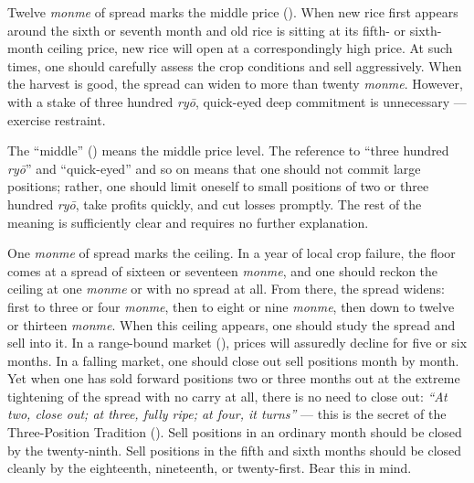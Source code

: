 
\begin{sokyubox}
{\small\itshape\color{sokyubar} }

\medskip
Twelve \textit{monme} of spread marks the middle price ().
When new rice first appears around the sixth or seventh month and
old rice is sitting at its fifth- or sixth-month ceiling price, new
rice will open at a correspondingly high price. At such times, one
should carefully assess the crop conditions and sell aggressively.
When the harvest is good, the spread can widen to more than twenty
\textit{monme}. However, with a stake of three hundred \textit{ry\=o}, quick-eyed
deep commitment is unnecessary --- exercise restraint.
\end{sokyubox}

\commentary
The ``middle'' () means the middle price level. The reference
to ``three hundred \textit{ry\=o}'' and ``quick-eyed'' and so on means that one
should not commit large positions; rather, one should limit oneself
to small positions of two or three hundred \textit{ry\=o}, take profits
quickly, and cut losses promptly. The rest of the meaning is
sufficiently clear and requires no further explanation.


\begin{sokyubox}
{\small\itshape\color{sokyubar} }

\medskip
One \textit{monme} of spread marks the ceiling. In a year of local crop
failure, the floor comes at a spread of sixteen or seventeen \textit{monme},
and one should reckon the ceiling at one \textit{monme} or with no spread at
all. From there, the spread widens: first to three or four \textit{monme},
then to eight or nine \textit{monme}, then down to twelve or thirteen \textit{monme}.
When this ceiling appears, one should study the spread and sell into
it. In a range-bound market (), prices will
assuredly decline for five or six months. In a falling market, one
should close out sell positions month by month. Yet when one has
sold forward positions two or three months out at the extreme
tightening of the spread with no carry at all, there is no need
to close out: \textit{``At two, close out; at three, fully ripe; at four,
it turns''} --- this is the secret of the Three-Position Tradition
(). Sell positions in an ordinary month
should be closed by the twenty-ninth. Sell positions in the fifth
and sixth months should be closed cleanly by the eighteenth,
nineteenth, or twenty-first. Bear this in mind.
\end{sokyubox}

